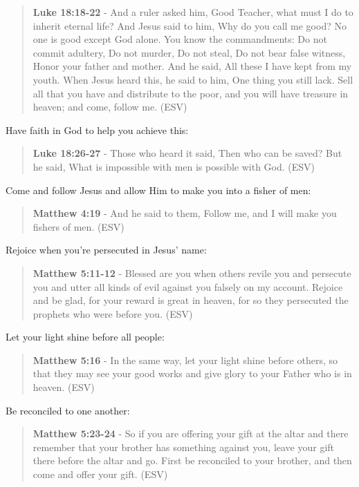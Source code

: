 \documentclass[11pt]{article}
\begin{document}
\begin{quote}
\textbf{Luke 18:18-22} - And a ruler asked him, Good Teacher, what must I do to inherit eternal life? And Jesus said to him, Why do you call me good? No one is good except God alone. You know the commandments: Do not commit adultery, Do not murder, Do not steal, Do not bear false witness, Honor your father and mother. And he said, All these I have kept from my youth. When Jesus heard this, he said to him, One thing you still lack. Sell all that you have and distribute to the poor, and you will have treasure in heaven; and come, follow me. (ESV)
\end{quote}

Have faith in God to help you achieve this:

\begin{quote}
\textbf{Luke 18:26-27} - Those who heard it said, Then who can be saved? But he said, What is impossible with men is possible with God. (ESV)
\end{quote}

Come and follow Jesus and allow Him to make you into a fisher of men:

\begin{quote}
\textbf{Matthew 4:19} - And he said to them, Follow me, and I will make you fishers of men. (ESV)
\end{quote}

Rejoice when you're persecuted in Jesus' name:

\begin{quote}
\textbf{Matthew 5:11-12} - Blessed are you when others revile you and persecute you and utter all kinds of evil against you falsely on my account. Rejoice and be glad, for your reward is great in heaven, for so they persecuted the prophets who were before you. (ESV)
\end{quote}

Let your light shine before all people:

\begin{quote}
\textbf{Matthew 5:16} - In the same way, let your light shine before others, so that they may see your good works and give glory to your Father who is in heaven. (ESV)
\end{quote}

Be reconciled to one another:

\begin{quote}
\textbf{Matthew 5:23-24} - So if you are offering your gift at the altar and there remember that your brother has something against you, leave your gift there before the altar and go. First be reconciled to your brother, and then come and offer your gift. (ESV)
\end{quote}
\end{document}
